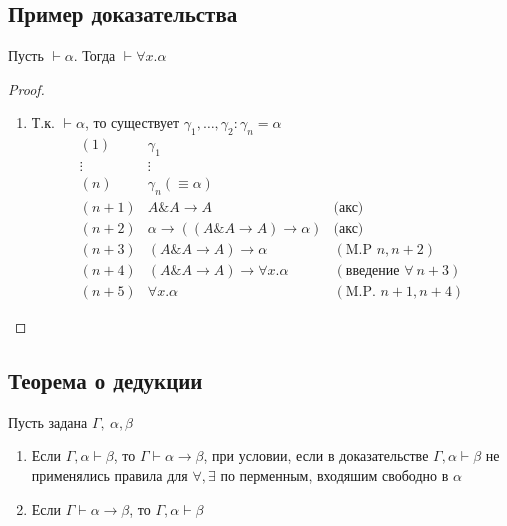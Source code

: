 \documentclass[english]{article}
\begin{document}
\subsection{Пример доказательства}
\label{sec:org947d7c2}
\begin{lemma}
	Пусть \(\vdash \alpha\). Тогда \(\vdash \forall x. \alpha\)
\end{lemma}
\begin{proof}
	\-
	\begin{enumerate}
		\item Т.к. \(\vdash \alpha\), то существует \(\gamma_1, \dots, \gamma_2: \gamma_n = \alpha\)
		      \[ \begin{matrix}
				      (1)     & \gamma_1                               &                                  \\
				      \vdots  & \vdots                                 &                                  \\
				      (n)     & \gamma_n (\equiv \alpha)               &                                  \\
				      (n + 1) & A\& A \to A                            & \text{(акс)}                     \\
				      (n + 2) & \alpha \to ((A \& A \to A) \to \alpha) & \text{(акс)}                     \\
				      (n + 3) & (A \& A \to A) \to \alpha              & (\text{M.P } n, n + 2)           \\
				      (n + 4) & (A \& A \to A) \to \forall x.\alpha    & (\text{введение }\forall\ n + 3) \\
				      (n + 5) & \forall x. \alpha                      & (\text{M.P. } n + 1, n + 4)
			      \end{matrix} \]
	\end{enumerate}
\end{proof}
\subsection{Теорема о дедукции}
\label{sec:org33235bd}
\begin{theorem}
	Пусть задана \(\Gamma,\ \alpha,\beta\)
	\begin{enumerate}
		\item Если \(\Gamma, \alpha \vdash \beta\), то \(\Gamma \vdash \alpha \to \beta\), при условии, если в доказательстве \(\Gamma, \alpha \vdash \beta\) не применялись правила для \(\forall, \exists\) по перменным, входяшим свободно в \(\alpha\)
		\item Если \(\Gamma \vdash \alpha \to \beta\), то \(\Gamma, \alpha \vdash \beta\)
	\end{enumerate}
	\label{orgdac7f7f}
\end{theorem}
\end{document}

